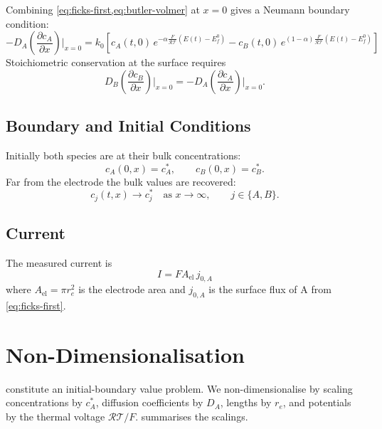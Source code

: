 Combining \cref{eq:ficks-first,eq:butler-volmer} at $x = 0$ gives a
Neumann boundary condition:
\begin{equation}
  -D_A\left(\frac{\partial c_A}{\partial x}\right)\bigg|_{x = 0} =
  k_0 \left[ c_A(t,0)\,
    e^{-\alpha \frac{F}{\mathcal{R}\mathcal{T}} (E(t) - E^0_f)}
    - c_B(t,0)\,
    e^{(1-\alpha) \frac{F}{\mathcal{R}\mathcal{T}} (E(t) - E^0_f)}
  \right]
  \label{eq:electrode-boundary-condition}
\end{equation}
Stoichiometric conservation at the surface requires
\begin{equation}
  D_B\left(\frac{\partial c_B}{\partial x}\right)\bigg|_{x = 0} =
  -D_A\left(\frac{\partial c_A}{\partial x}\right)\bigg|_{x = 0}.
  \label{eq:mass-conservation}
\end{equation}

\subsection{Boundary and Initial Conditions}

Initially both species are at their bulk concentrations:
\begin{equation}
  c_A(0, x) = c_A^*, \qquad c_B(0, x) = c_B^*.
  \label{eq:initial-conditions}
\end{equation}
Far from the electrode the bulk values are recovered:
\begin{equation}
  c_j(t, x) \to c_j^* \quad \text{as } x \to \infty, \qquad j \in \{A, B\}.
  \label{eq:infinite-boundary-condition}
\end{equation}

\subsection{Current}

The measured current is
\begin{equation}
  I = F A_{\mathrm{el}}\, j_{0, A}
  \label{eq:current}
\end{equation}
where $A_{\mathrm{el}} = \pi r_e^2$ is the electrode area and $j_{0,A}$
is the surface flux of $\mathrm{A}$ from \cref{eq:ficks-first}.

\section{Non-Dimensionalisation}\label{sec:nondim}

 constitute an
initial-boundary value problem. We non-dimensionalise by scaling
concentrations by $c_A^*$, diffusion coefficients by $D_A$, lengths by
$r_e$, and potentials by the thermal voltage $\mathcal{R}\mathcal{T}/F$.
 summarises the scalings.

